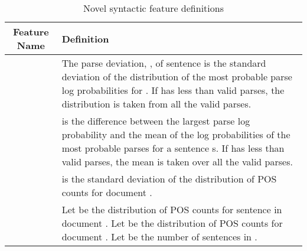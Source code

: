 \documentclass[11pt,a4paper]{article}
\theoremstyle{definition}
\begin{document}
\begin{table}[h]
\centering
\begin{tabular}{|c|p{13cm}|}
\hline
\textbf{Feature Name} & \textbf{Definition} \\\hline
 & The parse deviation, , of sentence  is the standard deviation of the distribution of the  most probable parse log probabilities for . If  has less than  valid parses, the distribution is taken from all the valid parses. \\\hline
 &  is the difference between the largest parse log probability and the mean of the log probabilities of the  most probable parses for a sentence s. If  has less than  valid parses, the mean is taken over all the valid parses. \\\hline
 &  is the standard deviation of the distribution of POS counts for document . \\\hline
 & Let  be the distribution of POS counts for sentence  in document . Let  be the distribution of POS counts for document . Let  be the number of sentences in .  \\\hline
\end{tabular}
\caption{Novel syntactic feature definitions}
\end{table}
\end{document}

